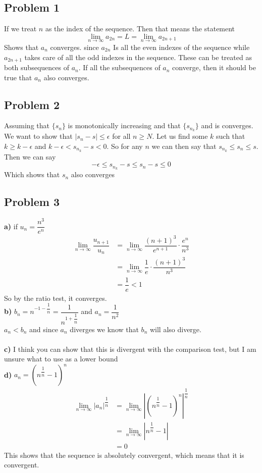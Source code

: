 \documentclass[12pt]{article}
\begin{document}
\subsection*{Problem 1}
If we treat $n$ as the index of the sequence. Then that means the statement
\[ \lim_{n \to \infty}a_{2n} = L = \lim_{n \to \infty}a_{2n + 1} \]
Shows that $a_n$ converges. since $a_{2n}$ Is all the even indexes of the sequence while $a_{2n+1}$ takes care of all the odd indexes in the sequence. These can be treated as both subsequences of $a_n$. If all the subsequences of $a_n$ converge, then it should be true that $a_n$ also converges.
\subsection*{Problem 2}
Assuming that $\{s_n\}$ is monotonically increasing and that $\{ s_{n_{k}} \}$ and is converges. We want to show that $|s_n - s| \leq \epsilon$ for all $n \geq N$. Let us find some $k$ such that $k \geq k - \epsilon $ and $k - \epsilon < s_{n_{k}} - s < 0$. So for any $n$ we can then say that $s_{n_{k}} \leq s_n \leq s$. Then we can say
\[ -\epsilon \leq s_{n_{k}} - s \leq s_n -s \leq 0\]
Which shows that $s_n$ also converges
\subsection*{Problem 3}
\textbf{a) } if $u_n = \dfrac{n^3}{e^n}$
\begin{align*}
\lim_{n \to \infty} \dfrac{u_{n+1}}{u_n} &=  \lim_{n \to \infty}\dfrac{(n+1)^3}{e^{n+1}} \cdot \dfrac{e^n}{n^3} \\
&= \lim_{n \to \infty} \dfrac{1}{e} \cdot \dfrac{(n+1)^3}{n^3} \\
&= \dfrac{1}{e} < 1
\end{align*}
So by the ratio test, it converges.\\
\textbf{b) } $b_n = n^{-1 - \dfrac{1}{n}} = \dfrac{1}{n^{1 + \dfrac{1}{n}}}$ and $a_n = \dfrac{1}{n^2}$\\
$a_n < b_n$ and since $a_n$ diverges we know that $b_n$ will also diverge.\\\\
\textbf{c)} I think you can show that this is divergent with the comparison test, but I am unsure what to use as a lower bound\\
\textbf{d)} $a_n = (n^{\dfrac{1}{n}} - 1)^n$
\begin{align*}
\lim_{n \to \infty} |a_n|^{\dfrac{1}{n}} &= \lim_{n \to \infty} |(n^{\dfrac{1}{n}} - 1)^n|^{\dfrac{1}{n}}\\
&= \lim_{n \to \infty} | n^{\dfrac{1}{n}} - 1| \\
&= 0
\end{align*}
This shows that the sequence is absolutely convergent, which means that it is convergent.
\end{document}
